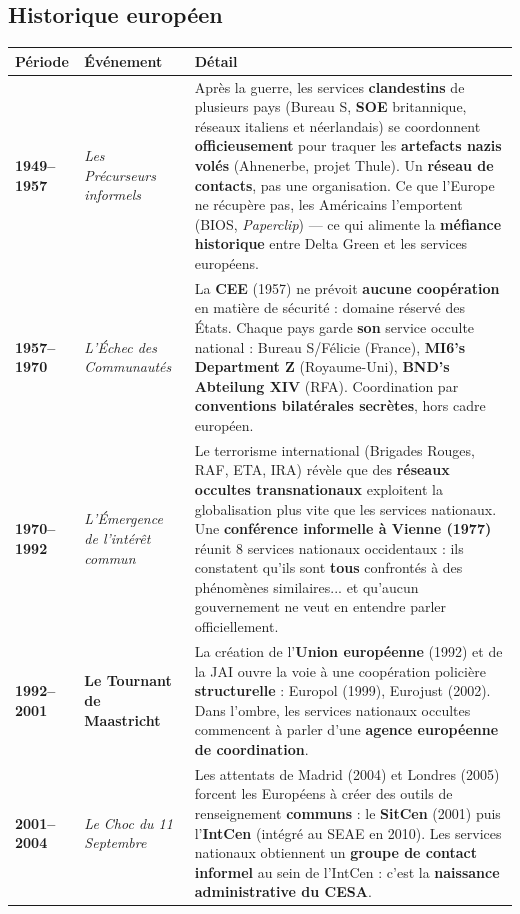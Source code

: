 \documentclass[10pt,a5paper,twoside]{book}
\begin{document}
\subsection{Historique européen}

\begin{center}
\begin{longtable}{|P{2.0cm}|P{3.0cm}|P{5.0cm}|}
\hline
\textbf{Période} & \textbf{Événement} & \textbf{Détail} \\
\hline
\textbf{1949--1957} & \textit{Les Précurseurs informels} & Après la guerre, les services \textbf{clandestins} de plusieurs pays (Bureau S, \textbf{SOE} britannique, réseaux italiens et néerlandais) se coordonnent \textbf{officieusement} pour traquer les \textbf{artefacts nazis volés} (Ahnenerbe, projet Thule). Un \textbf{réseau de contacts}, pas une organisation. Ce que l'Europe ne récupère pas, les Américains l'emportent (BIOS, \textit{Paperclip}) --- ce qui alimente la \textbf{méfiance historique} entre Delta Green et les services européens. \\
\hline
\textbf{1957--1970} & \textit{L'Échec des Communautés} & La \textbf{CEE} (1957) ne prévoit \textbf{aucune coopération} en matière de sécurité : domaine réservé des États. Chaque pays garde \textbf{son} service occulte national : Bureau S/Félicie (France), \textbf{MI6's Department Z} (Royaume-Uni), \textbf{BND's Abteilung XIV} (RFA). Coordination par \textbf{conventions bilatérales secrètes}, hors cadre européen. \\
\hline
\textbf{1970--1992} & \textit{L'Émergence de l'intérêt commun} & Le terrorisme international (Brigades Rouges, RAF, ETA, IRA) révèle que des \textbf{réseaux occultes transnationaux} exploitent la globalisation plus vite que les services nationaux. Une \textbf{conférence informelle à Vienne (1977)} réunit 8 services nationaux occidentaux : ils constatent qu'ils sont \textbf{tous} confrontés à des phénomènes similaires... et qu'aucun gouvernement ne veut en entendre parler officiellement. \\
\hline
\textbf{1992--2001} & \textbf{Le Tournant de Maastricht} & La création de l'\textbf{Union européenne} (1992) et de la JAI ouvre la voie à une coopération policière \textbf{structurelle} : Europol (1999), Eurojust (2002). Dans l'ombre, les services nationaux occultes commencent à parler d'une \textbf{agence européenne de coordination}. \\
\hline
\textbf{2001--2004} & \textit{Le Choc du 11 Septembre} & Les attentats de Madrid (2004) et Londres (2005) forcent les Européens à créer des outils de renseignement \textbf{communs} : le \textbf{SitCen} (2001) puis l'\textbf{IntCen} (intégré au SEAE en 2010). Les services nationaux obtiennent un \textbf{groupe de contact informel} au sein de l'IntCen : c'est la \textbf{naissance administrative du CESA}. \\

\end{longtable}
\end{center}
\end{document}
